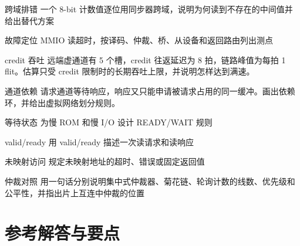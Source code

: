 \begin{chapterexercise}{跨域排错}
一个 8-bit 计数值逐位用同步器跨域，说明为何读到不存在的中间值并给出替代方案
\end{chapterexercise}

\begin{chapterexercise}{故障定位}
MMIO 读超时，按译码、仲裁、桥、从设备和返回路由列出测点
\end{chapterexercise}

\begin{chapterexercise}{credit 吞吐}
远端虚通道有 5 个槽，credit 往返延迟为 8 拍，链路峰值为每拍 1 flit。估算只受 credit 限制时的长期吞吐上限，并说明怎样达到满速。
\end{chapterexercise}

\begin{chapterexercise}{通道依赖}
请求通道等待响应，响应又只能申请被请求占用的同一缓冲。画出依赖环，并给出虚拟网络划分规则。
\end{chapterexercise}

\begin{chapterexercise}{等待状态}
为慢 ROM 和慢 I/O 设计 READY/WAIT 规则
\end{chapterexercise}

\begin{chapterexercise}{valid/ready}
用 valid/ready 描述一次读请求和读响应
\end{chapterexercise}

\begin{chapterexercise}{未映射访问}
规定未映射地址的超时、错误或固定返回值
\end{chapterexercise}

\begin{chapterexercise}{仲裁对照}
用一句话分别说明集中式仲裁器、菊花链、轮询计数的线数、优先级和公平性，并指出片上互连中仲裁的位置
\end{chapterexercise}

\section*{参考解答与要点}

